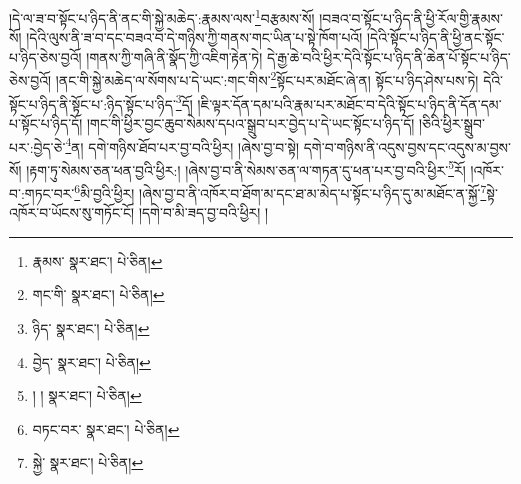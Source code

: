 །དེ་ལ་ཟ་བ་སྟོང་པ་ཉིད་ནི་ནང་གི་སྐྱེ་མཆེད་:རྣམས་ལས་\footnote{རྣམས་  སྣར་ཐང་།  པེ་ཅིན། }བརྩམས་སོ། །བཟའ་བ་སྟོང་པ་ཉིད་ནི་ཕྱི་རོལ་གྱི་རྣམས་སོ། །དེའི་ལུས་ནི་ཟ་བ་དང་བཟའ་བ་དེ་གཉིས་ཀྱི་གནས་གང་ཡིན་པ་སྟེ་ཁོག་པའོ། །དེའི་སྟོང་པ་ཉིད་ནི་ཕྱི་ནང་སྟོང་པ་ཉིད་ཅེས་བྱའོ། །གནས་ཀྱི་གཞི་ནི་སྣོད་ཀྱི་འཇིག་རྟེན་ཏེ། དེ་རྒྱ་ཆེ་བའི་ཕྱིར་དེའི་སྟོང་པ་ཉིད་ནི་ཆེན་པོ་སྟོང་པ་ཉིད་ཅེས་བྱའོ། །ནང་གི་སྐྱེ་མཆེད་ལ་སོགས་པ་དེ་ཡང་:གང་གིས་\footnote{གང་གི་  སྣར་ཐང་།  པེ་ཅིན། }སྟོང་པར་མཐོང་ཞེ་ན། སྟོང་པ་ཉིད་ཤེས་པས་ཏེ། དེའི་སྟོང་པ་ཉིད་ནི་སྟོང་པ་:ཉིད་སྟོང་པ་ཉིད་\footnote{ཉིད་  སྣར་ཐང་།  པེ་ཅིན། }དོ། །ཇི་ལྟར་དོན་དམ་པའི་རྣམ་པར་མཐོང་བ་དེའི་སྟོང་པ་ཉིད་ནི་དོན་དམ་པ་སྟོང་པ་ཉིད་དོ། །གང་གི་ཕྱིར་བྱང་ཆུབ་སེམས་དཔའ་སྒྲུབ་པར་བྱེད་པ་དེ་ཡང་སྟོང་པ་ཉིད་དོ། །ཅིའི་ཕྱིར་སྒྲུབ་པར་:བྱེད་ཅེ་\footnote{བྱེད་  སྣར་ཐང་།  པེ་ཅིན། }ན། དགེ་གཉིས་ཐོབ་པར་བྱ་བའི་ཕྱིར། །ཞེས་བྱ་བ་སྟེ། དགེ་བ་གཉིས་ནི་འདུས་བྱས་དང་འདུས་མ་བྱས་སོ། །རྟག་ཏུ་སེམས་ཅན་ཕན་བྱའི་ཕྱིར:། །ཞེས་བྱ་བ་ནི་སེམས་ཅན་ལ་གཏན་དུ་ཕན་པར་བྱ་བའི་ཕྱིར་\footnote{། །  སྣར་ཐང་།  པེ་ཅིན། }རོ། །འཁོར་བ་:གཏང་བར་\footnote{བཏང་བར་  སྣར་ཐང་།  པེ་ཅིན། }མི་བྱའི་ཕྱིར། །ཞེས་བྱ་བ་ནི་འཁོར་བ་ཐོག་མ་དང་ཐ་མ་མེད་པ་སྟོང་པ་ཉིད་དུ་མ་མཐོང་ན་སྐྱོ་\footnote{སྐྱེ་  སྣར་ཐང་།  པེ་ཅིན། }སྟེ་འཁོར་བ་ཡོངས་སུ་གཏོང་ངོ། །དགེ་བ་མི་ཟད་བྱ་བའི་ཕྱིར། །
